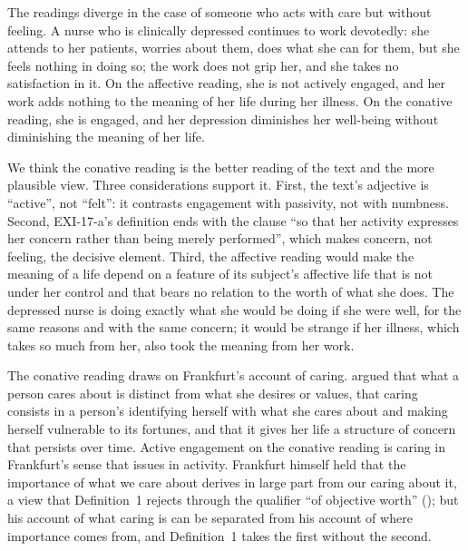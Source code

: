The readings diverge in the case of someone who acts with care but without feeling. A nurse who is clinically depressed continues to work devotedly: she attends to her patients, worries about them, does what she can for them, but she feels nothing in doing so; the work does not grip her, and she takes no satisfaction in it. On the affective reading, she is not actively engaged, and her work adds nothing to the meaning of her life during her illness. On the conative reading, she is engaged, and her depression diminishes her well-being without diminishing the meaning of her life.

We think the conative reading is the better reading of the text and the more plausible view. Three considerations support it. First, the text's adjective is \enquote{active}, not \enquote{felt}: it contrasts engagement with passivity, not with numbness. Second, EXI-17-a's definition ends with the clause \enquote{so that her activity expresses her concern rather than being merely performed}, which makes concern, not feeling, the decisive element. Third, the affective reading would make the meaning of a life depend on a feature of its subject's affective life that is not under her control and that bears no relation to the worth of what she does. The depressed nurse is doing exactly what she would be doing if she were well, for the same reasons and with the same concern; it would be strange if her illness, which takes so much from her, also took the meaning from her work.

The conative reading draws on Frankfurt's account of caring. \citet{Frankfurt1982} argued that what a person cares about is distinct from what she desires or values, that caring consists in a person's identifying herself with what she cares about and making herself vulnerable to its fortunes, and that it gives her life a structure of concern that persists over time. Active engagement on the conative reading is caring in Frankfurt's sense that issues in activity. Frankfurt himself held that the importance of what we care about derives in large part from our caring about it, a view that Definition~1 rejects through the qualifier \enquote{of objective worth} (); but his account of what caring is can be separated from his account of where importance comes from, and Definition~1 takes the first without the second.

